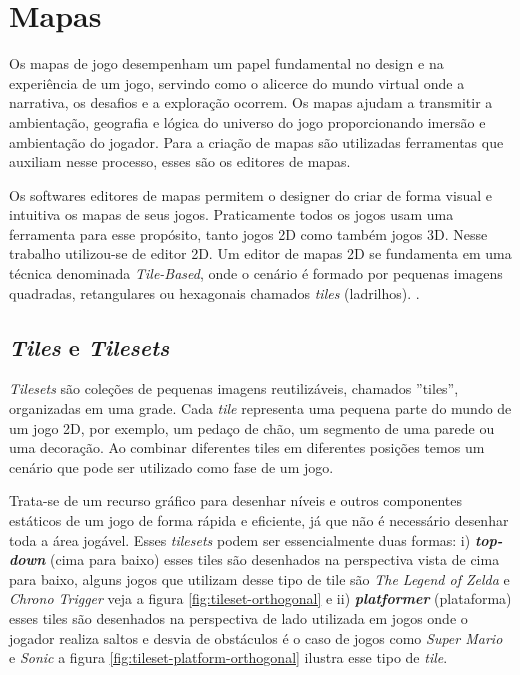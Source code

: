 \section{Mapas}
\label{sec-mapas}

Os mapas de jogo desempenham um papel fundamental no design e na experiência de um jogo, servindo como o alicerce do mundo virtual onde a narrativa, os desafios e a exploração ocorrem. Os mapas ajudam a transmitir a ambientação, geografia e lógica do universo do jogo proporcionando imersão e ambientação do jogador. Para a criação de mapas são utilizadas ferramentas que auxiliam nesse processo, esses são os editores de mapas.

 Os softwares editores de mapas permitem o designer do criar de forma visual e intuitiva os mapas de seus jogos. Praticamente todos os jogos usam uma ferramenta para esse propósito, tanto jogos 2D como também jogos 3D. Nesse trabalho  utilizou-se de editor 2D. Um editor de mapas 2D se fundamenta em uma técnica denominada \textit{Tile-Based}, onde o cenário é formado por pequenas imagens quadradas, retangulares ou hexagonais chamados \textit{tiles} (ladrilhos). .

\subsection{\textit{Tiles} e \textit{Tilesets}}
\label{sec:tiles-e-tilesets}
\textit{Tilesets} são coleções de pequenas imagens reutilizáveis, chamados ''tiles'', organizadas em uma grade. Cada \textit{tile} representa uma pequena parte do mundo de um jogo 2D, por exemplo, um pedaço de chão, um segmento de uma parede ou uma decoração. Ao combinar diferentes tiles em diferentes posições temos um cenário que pode ser utilizado como fase de um jogo. 

Trata-se de um recurso gráfico para desenhar níveis e outros componentes estáticos de um jogo de forma rápida e eficiente, já que não é necessário desenhar toda a área jogável. Esses \textit{tilesets} podem ser essencialmente duas formas: i) \textit{\textbf{top-down}} (cima para baixo) esses tiles são desenhados na perspectiva vista de cima para baixo, alguns jogos que utilizam desse tipo de tile são \textit{The Legend of Zelda} e \textit{Chrono Trigger} veja a figura \ref{fig:tileset-orthogonal} e ii) \textit{\textbf{platformer}} (plataforma) esses tiles são desenhados na perspectiva de lado utilizada em jogos onde o jogador realiza saltos e desvia de obstáculos é o caso de jogos como \textit{Super Mario} e \textit{Sonic} a figura \ref{fig:tileset-platform-orthogonal} ilustra esse tipo de \textit{tile}.

